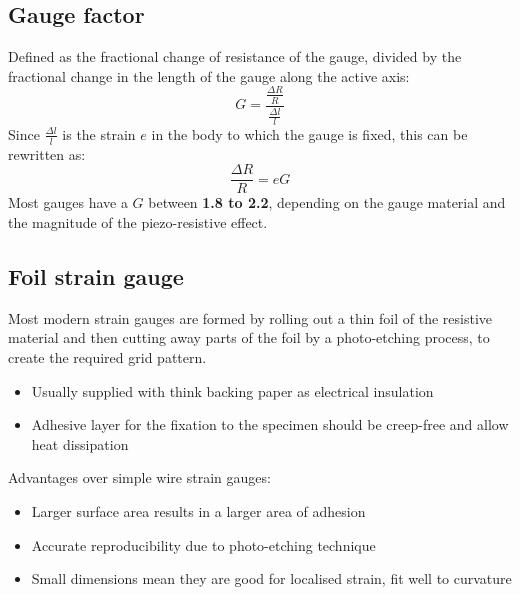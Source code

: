 \documentclass[class=report, crop=false, 12pt,a4paper]{standalone}
\begin{document}
\subsection{Gauge factor}
Defined as the fractional change of resistance of the gauge, divided by the fractional change in the length of the gauge along the active axis:
\begin{equation}
  G = \frac{\frac{\Delta R}{R}}{\frac{\Delta l}{l}}
\end{equation}
Since $\frac{\Delta l}{l}$ is the strain $e$ in the body to which the gauge is fixed, this can be rewritten as:
\begin{equation}
  \frac{\Delta R}{R} = eG
\end{equation}
Most gauges have a $G$ between \textbf{1.8 to 2.2}, depending on the gauge material and the magnitude of the piezo-resistive effect.
\subsection{Foil strain gauge}
Most modern strain gauges are formed by rolling out a thin foil of the resistive material and then cutting away parts of the foil by a photo-etching process, to create the required grid pattern.
\begin{itemize}
  \item Usually supplied with think backing paper as electrical insulation
  \item Adhesive layer for the fixation to the specimen should be creep-free and allow heat dissipation
\end{itemize}
Advantages over simple wire strain gauges:
\begin{itemize}
  \item Larger surface area results in a larger area of adhesion
  \item Accurate reproducibility due to photo-etching technique
  \item Small dimensions mean they are good for localised strain, fit well to curvature
\end{itemize}
\end{document}
